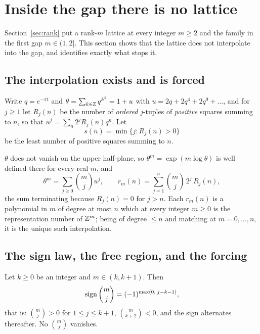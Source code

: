 \section{Inside the gap there is no lattice}\label{sec:pointcount}

Section~\ref{sec:rank} put a rank-$m$ lattice at every integer $m\ge2$ and the
family in the first gap $m\in(1,2]$. This section shows that the lattice does not
interpolate into the gap, and identifies exactly what stops it.

\subsection{The interpolation exists and is forced}\label{sec:interpolation}

Write $q=e^{-\pi t}$ and $\theta=\sum_{k\in\mathbb Z}q^{k^{2}}=1+u$ with
$u=2q+2q^{4}+2q^{9}+\dots$, and for $j\ge1$ let $R_j(n)$ be the number of
\emph{ordered} $j$-tuples of \emph{positive} squares summing to $n$, so that
$u^{j}=\sum_n2^{j}R_j(n)q^{n}$. Let
\begin{equation}\label{eq:smin}
 s(n)=\min\{j:R_j(n)>0\}
\end{equation}
be the least number of positive squares summing to $n$.

\begin{proposition}\label{prop:interp}
$\theta$ does not vanish on the upper half-plane, so $\theta^{m}=\exp(m\log\theta)$
is well defined there for every real $m$, and
\begin{equation}\label{eq:rmn}
 \theta^{m}=\sum_{j\ge0}\binom mj u^{j},\qquad
 r_m(n)=\sum_{j=1}^{n}\binom mj\,2^{j}\,R_j(n),
\end{equation}
the sum terminating because $R_j(n)=0$ for $j>n$. Each $r_m(n)$ is a polynomial
in $m$ of degree at most $n$ which at every integer $m\ge0$ is the representation
number of $\mathbb Z^{m}$; being of degree $\le n$ and matching at $m=0,\dots,n$, it is
the unique such interpolation.
\end{proposition}

\subsection{The sign law, the free region, and the forcing}\label{sec:signlaw}

\begin{proposition}\label{prop:signlaw}
Let $k\ge0$ be an integer and $m\in(k,k+1)$. Then
\begin{equation}\label{eq:signlaw}
 \operatorname{sign}\binom mj=(-1)^{\max(0,\;j-k-1)},
\end{equation}
that is: $\binom mj>0$ for $1\le j\le k+1$, $\binom m{k+2}<0$, and the sign
alternates thereafter. No $\binom mj$ vanishes.
\end{proposition}

